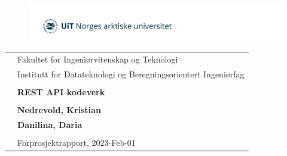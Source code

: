 \begin{center}

\begin{figure}[ht]
\centering
\includegraphics{images/Picture1.png}
\end{figure}

\hfill \break
\begin{tabular}{ll}
     &Fakultet for Ingeniørvitenskap og Teknologi \\
     &Institutt for Datateknologi og Beregningsorientert Ingeniørfag \\
     \hfill \break\\
     &\large{\textbf{REST API kodeverk}} \\     
     \hfill \break \\   
     &\textbf{Nedrevold, Kristian} \\
     &\textbf{Danilina, Daria} \\
     \hfill \break\\
     &Forprosjektrapport, 2023-Feb-01 \\
\end{tabular}

\thispagestyle{empty} 

\end{center}